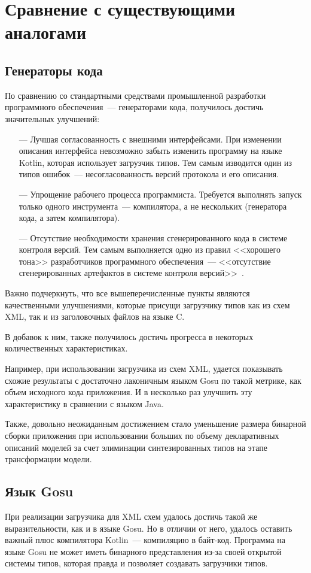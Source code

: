 \section{Сравнение с существующими аналогами}

\subsection{Генераторы кода}\label{res:generators}
По сравнению со стандартными средствами промышленной разработки программного обеспечения~--- генераторами кода,
получилось достичь значительных улучшений:
\begin{itemize}
	\item[---] Лучшая согласованность с внешними интерфейсами. При изменении описания интерфейса невозможно забыть изменить программу на языке Kotlin, которая использует загрузчик типов. Тем самым изводится один из типов ошибок~--- несогласованность версий протокола и его описания.
	\item[---] Упрощение рабочего процесса программиста. Требуется выполнять запуск только одного инструмента~--- компилятора, а не нескольких (генератора кода, а затем компилятора).
	\item[---] Отсутствие необходимости хранения сгенерированного кода в системе контроля версий. Тем самым выполняется одно из правил <<хорошего тона>> разработчиков программного обеспечения~--- <<отсутствие сгенерированных артефактов в системе контроля версий>>~\cite{art-of-agile}.
\end{itemize}

Важно подчеркнуть, что все вышеперечисленные пункты являются качественными улучшениями, которые присущи загрузчику типов как из схем XML, так и из заголовочных файлов на языке C.

В добавок к ним, также получилось достичь прогресса в некоторых количественных характеристиках.

Например, при использовании загрузчика из схем XML, удается показывать схожие результаты с достаточно лаконичным языком Gosu по такой метрике, как объем исходного кода приложения.
И в несколько раз улучшить эту характеристику в сравнении с языком Java.

Также, довольно неожиданным достижением стало уменьшение размера бинарной сборки приложения при использовании больших по объему декларативных описаний моделей за счет элиминации синтезированных типов на этапе трансформации модели.

\subsection{Язык Gosu}\label{xml-gosu-result}
При реализации загрузчика для XML схем удалось достичь такой же выразительности, как и в языке Gosu.
Но в отличии от него, удалось оставить важный плюс компилятора Kotlin~--- компиляцию в байт-код.
Программа на языке Gosu не может иметь бинарного представления из-за своей открытой системы типов,
которая правда и позволяет создавать загрузчики типов.

